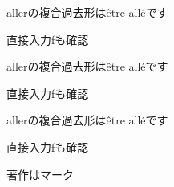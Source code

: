 \documentclass[a4paper,dvipdfmx]{article}
\begin{document}
\noautospacing \noautoxspacing
\selectfont
allerの複合過去形は\^etre all\'eです\par
直接入力ƒも確認\par
\selectfont
allerの複合過去形は\^etre all\'eです\par
直接入力ƒも確認\par
\selectfont
allerの複合過去形は\^etre all\'eです\par
直接入力ƒも確認\par
著作は\textcopyright マーク\par
\end{document}
